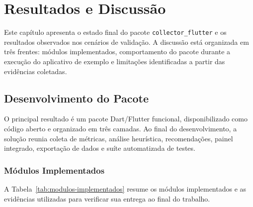 
\chapter{Resultados e Discussão}

Este capítulo apresenta o estado final do pacote \texttt{collector\_flutter} e os resultados observados nos cenários de validação. A discussão está organizada em três frentes: módulos implementados, comportamento do pacote durante a execução do aplicativo de exemplo e limitações identificadas a partir das evidências coletadas.

\section{Desenvolvimento do Pacote}

O principal resultado é um pacote Dart/Flutter funcional, disponibilizado como código aberto e organizado em três camadas. Ao final do desenvolvimento, a solução reunia coleta de métricas, análise heurística, recomendações, painel integrado, exportação de dados e suíte automatizada de testes.

\subsection{Módulos Implementados}

A Tabela~\ref{tab:modulos-implementados} resume os módulos implementados e as evidências utilizadas para verificar sua entrega ao final do trabalho.

